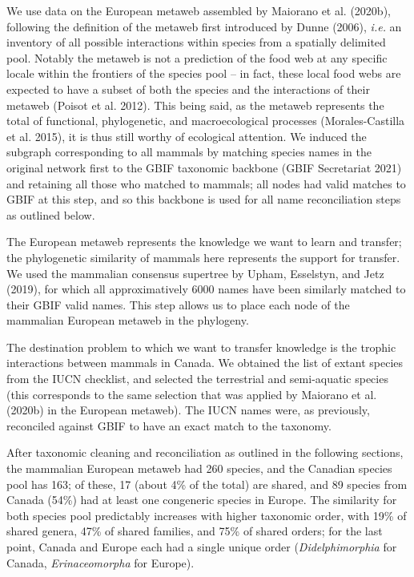 \documentclass[11pt]{article}
\begin{document}
We use data on the European metaweb assembled by Maiorano et al.
(2020b), following the definition of the metaweb first introduced by
Dunne (2006), \emph{i.e.} an inventory of all possible interactions
within species from a spatially delimited pool. Notably the metaweb is
not a prediction of the food web at any specific locale within the
frontiers of the species pool -- in fact, these local food webs are
expected to have a subset of both the species and the interactions of
their metaweb (Poisot et al. 2012). This being said, as the metaweb
represents the total of functional, phylogenetic, and macroecological
processes (Morales-Castilla et al. 2015), it is thus still worthy of
ecological attention. We induced the subgraph corresponding to all
mammals by matching species names in the original network first to the
GBIF taxonomic backbone (GBIF Secretariat 2021) and retaining all those
who matched to mammals; all nodes had valid matches to GBIF at this
step, and so this backbone is used for all name reconciliation steps as
outlined below.

The European metaweb represents the knowledge we want to learn and
transfer; the phylogenetic similarity of mammals here represents the
support for transfer. We used the mammalian consensus supertree by
Upham, Esselstyn, and Jetz (2019), for which all approximatively 6000
names have been similarly matched to their GBIF valid names. This step
allows us to place each node of the mammalian European metaweb in the
phylogeny.

The destination problem to which we want to transfer knowledge is the
trophic interactions between mammals in Canada. We obtained the list of
extant species from the IUCN checklist, and selected the terrestrial and
semi-aquatic species (this corresponds to the same selection that was
applied by Maiorano et al. (2020b) in the European metaweb). The IUCN
names were, as previously, reconciled against GBIF to have an exact
match to the taxonomy.

After taxonomic cleaning and reconciliation as outlined in the following
sections, the mammalian European metaweb had 260 species, and the
Canadian species pool has 163; of these, 17 (about 4\% of the total) are
shared, and 89 species from Canada (54\%) had at least one congeneric
species in Europe. The similarity for both species pool predictably
increases with higher taxonomic order, with 19\% of shared genera, 47\%
of shared families, and 75\% of shared orders; for the last point,
Canada and Europe each had a single unique order (\emph{Didelphimorphia}
for Canada, \emph{Erinaceomorpha} for Europe).
\end{document}

